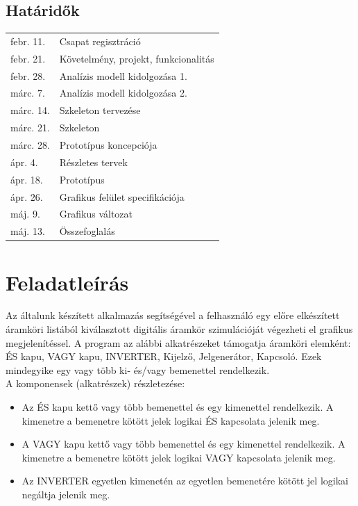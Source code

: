 \subsection{Határidők}

\begin{tabular}{l | l}
febr. 11. & Csapat regisztráció \\
febr. 21. & Követelmény, projekt, funkcionalitás \\
febr. 28. & Analízis modell kidolgozása 1. \\
márc. 7. & Analízis modell kidolgozása 2. \\
márc. 14. & Szkeleton tervezése \\
márc. 21. & Szkeleton \\
márc. 28. & Prototípus koncepciója \\
ápr.  4. & Részletes tervek \\
ápr. 18. & Prototípus \\
ápr. 26. & Grafikus felület specifikációja \\
máj. 9. & Grafikus változat \\
máj. 13. & Összefoglalás
\end{tabular}

\section{Feladatleírás}

Az általunk készített alkalmazás segítségével a felhasználó egy előre elkészített áramköri listából kiválasztott digitális áramkör szimulációját végezheti el grafikus megjelenítéssel. A program az alábbi alkatrészeket támogatja áramköri elemként: ÉS kapu, VAGY kapu, INVERTER, Kijelző, Jelgenerátor, Kapcsoló. Ezek mindegyike egy vagy több ki- és/vagy bemenettel rendelkezik.\\

\noindent A komponensek (alkatrészek) részletezése:

\begin{itemize}
\item Az ÉS kapu kettő vagy több bemenettel és egy kimenettel rendelkezik. A kimenetre a bemenetre kötött jelek logikai ÉS kapcsolata jelenik meg. 
\item A VAGY kapu kettő vagy több bemenettel és egy kimenettel rendelkezik. A kimenetre a bemenetre kötött jelek logikai VAGY kapcsolata jelenik meg.
\item Az INVERTER egyetlen kimenetén az egyetlen bemenetére kötött jel logikai negáltja jelenik meg.
\end{itemize}

